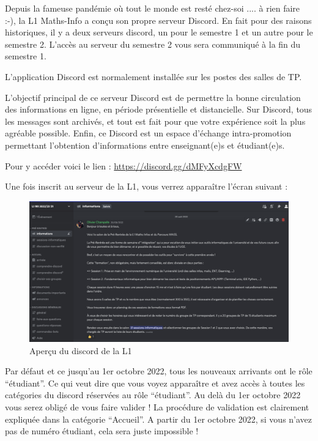 \documentclass{article}
\begin{document}
\begin{exercice}[Le discord de la L1]

Depuis la fameuse pandémie où tout le monde est resté chez-soi .... à rien faire :-), la L1 Maths-Info a con\c cu son propre serveur Discord. En fait pour des raisons historiques, il y a deux serveurs discord, un pour le semestre 1 et un autre pour le semestre 2. L'accès au serveur du semestre 2 vous sera communiqué à la fin du semestre 1. 

L'application Discord est normalement installée sur les postes des salles de TP.

\medskip

L'objectif principal de ce serveur Discord est de permettre la bonne circulation des informations en ligne, en période présentielle et distancielle. Sur Discord, tous les messages sont archivés, et tout est fait pour que votre expérience soit la plus agréable possible. Enfin, ce Discord est un espace d'échange intra-promotion permettant l'obtention d'informations entre enseignant(e)s et étudiant(e)s. 

Pour y accéder voici le lien : \url{https://discord.gg/dMFyXcdgFW} 

Une fois inscrit au serveur de la L1, vous verrez apparaître l'écran suivant : 

\begin{figure}[h!]
    \begin{center}
    \includegraphics[scale=0.3]{Apercu_Discord_L1.png}
    \caption{Aper\c cu du discord de la L1}
     \end{center}
\end{figure}  

Par défaut et ce jusqu'au 1er octobre 2022, tous les nouveaux arrivants ont le rôle ``étudiant''. Ce qui veut dire que vous voyez apparaître et avez accès à toutes les catégories du discord réservées au rôle ``étudiant''. Au delà du 1er octobre 2022 vous serez obligé de vous faire valider ! La procédure de validation est clairement expliquée dans la catégorie ``Accueil''. A partir du 1er octobre 2022, si vous n'avez pas de numéro étudiant, cela sera juste impossible !


\end{exercice}
\end{document}

